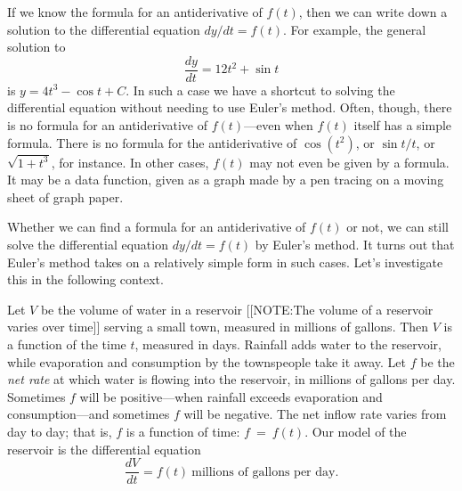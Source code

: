 If we know the formula for an antiderivative of $f(t)$, then we can
write down a solution to the differential equation $dy/dt = f(t)$.
For example, the general solution to
        \[
\dfrac{dy}{dt} = 12t^2 + \sin{t}
\]
is $y = 4t^3 - \cos{t} + C$.  In such a case we have a shortcut to solving the differential equation without needing to use Euler's method.  Often, though, there is no formula for an antiderivative of $f(t)$---even when $f(t)$ itself has a simple formula.  There is no formula for the antiderivative of $\cos(t^2)$, or $\sin{t}/t$, or $\sqrt{1 + t^3}$, for instance.  In other cases, $f(t)$ may not even be given by a formula.  It may be a data function, given as a graph made by a pen tracing on a moving sheet of graph paper.

        Whether we can find a formula for an antiderivative of $f(t)$ or not, we can still solve the differential equation $dy/dt = f(t)$ by Euler's method. It turns out that Euler's method takes on a relatively simple form in such cases.  Let's investigate this in the following context.  

        Let $V$ be the volume of water in a reservoir 
        [[NOTE:The volume  of a reservoir  varies over time]]
serving a small town, measured in millions of gallons.  Then $V$ is a function of the time $t$, measured in days.  Rainfall adds water to the reservoir, while evaporation and consumption by the townspeople take it away.  Let $f$ be the {\em net rate\/} at which water is flowing into the reservoir, in millions of gallons per day.  Sometimes $f$ will be positive---when rainfall exceeds evaporation and consumption---and sometimes $f$ will be negative.  The net inflow rate varies from day to day; that is, $f$ is a function of time: $f~=~f(t)$.  Our model of the reservoir is the differential equation
        \[
\dfrac{dV}{dt} = f(t) \ 
                \mbox{millions of gallons per day}.
\]

